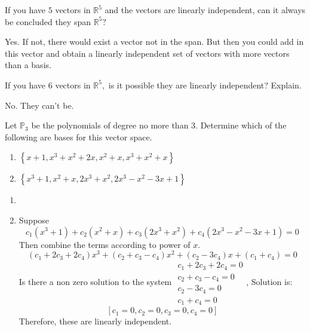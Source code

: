 \documentclass{ximera}
\begin{document}
\begin{problem}\label{prb:10.56} If you have $5$ vectors in $\mathbb{R}^{5}$ and the vectors are
linearly independent, can it always be concluded they span $\mathbb{R}^{5}?$
\begin{hint}
Yes. If not, there would exist a vector not in the span. But then
you could add in this vector and obtain a linearly independent set of
vectors with more vectors than a basis.
\end{hint}
\end{problem}

\begin{problem}\label{prb:10.57} If you have $6$ vectors in $\mathbb{R}^{5},$ is it possible they are
linearly independent? Explain.
\begin{hint}
No. They can't be.
\end{hint}
\end{problem}

\begin{problem}\label{prb:10.58} Let $\mathbb{P}_3$ be the polynomials of degree no more than 3. Determine which
of the following are bases for this vector space.

\begin{enumerate}
\item $\left\{ x+1,x^{3}+x^{2}+2x,x^{2}+x,x^{3}+x^{2}+x\right\} $

\item $\left\{ x^{3}+1,x^{2}+x,2x^{3}+x^{2},2x^{3}-x^{2}-3x+1\right\} $
\end{enumerate}

\begin{hint}
\begin{enumerate}
\item
\item
Suppose
\[
c_{1}\left( x^{3}+1\right) +c_{2}\left( x^{2}+x\right) +c_{3}\left(
2x^{3}+x^{2}\right) +c_{4}\left( 2x^{3}-x^{2}-3x+1\right) =0
\]
Then combine the terms according to power of $x.$
\[
\left( c_{1}+2c_{3}+2c_{4}\right) x^{3}+\left( c_{2}+c_{3}-c_{4}\right)
x^{2}+\left( c_{2}-3c_{4}\right) x+\left( c_{1}+c_{4}\right) =0
\]
Is there a non zero solution to the system $
\begin{array}{c}
c_{1}+2c_{3}+2c_{4}=0 \\
c_{2}+c_{3}-c_{4}=0 \\
c_{2}-3c_{4}=0 \\
c_{1}+c_{4}=0
\end{array}
$, Solution is:
\[
\left[ c_{1}=0,c_{2}=0,c_{3}=0,c_{4}=0\right]
\]
Therefore, these are linearly independent.
\end{enumerate}
\end{hint}
\end{problem}
\end{document}
